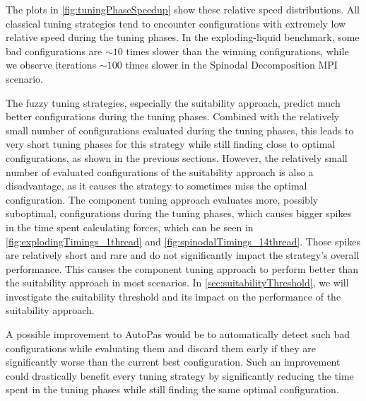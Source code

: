 The plots in \autoref{fig:tuningPhaseSpeedup} show these relative speed distributions. All classical tuning strategies tend to encounter configurations with extremely low relative speed during the tuning phases. In the exploding-liquid benchmark, some bad configurations are $\sim10$ times slower than the winning configurations, while we observe iterations $\sim100$ times slower in the Spinodal Decomposition MPI scenario.

The fuzzy tuning strategies, especially the suitability approach, predict much better configurations during the tuning phases. Combined with the relatively small number of configurations evaluated during the tuning phases, this leads to very short tuning phases for this strategy while still finding close to optimal configurations, as shown in the previous sections. However, the relatively small number of evaluated configurations of the suitability approach is also a disadvantage, as it causes the strategy to sometimes miss the optimal configuration.
The component tuning approach evaluates more, possibly suboptimal, configurations during the tuning phases, which causes bigger spikes in the time spent calculating forces, which can be seen in \autoref{fig:explodingTimings_1thread} and \autoref{fig:spinodalTimings_14thread}. Those spikes are relatively short and rare and do not significantly impact the strategy's overall performance. This causes the component tuning approach to perform better than the suitability approach in most scenarios.
In \autoref{sec:suitabilityThreshold}, we will investigate the suitability threshold and its impact on the performance of the suitability approach.

\smallskip

A possible improvement to AutoPas would be to automatically detect such bad configurations while evaluating them and discard them early if they are significantly worse than the current best configuration. Such an improvement could drastically benefit every tuning strategy by significantly reducing the time spent in the tuning phases while still finding the same optimal configuration.


\newpage

